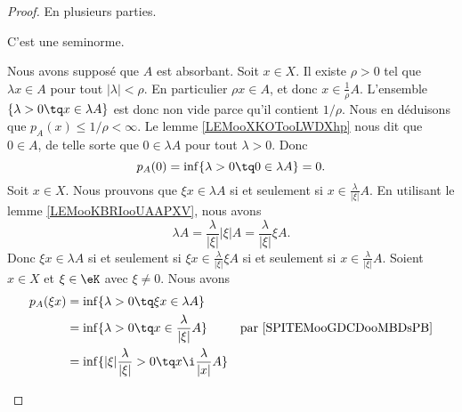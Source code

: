 \begin{proof}
	En plusieurs parties.
	\begin{proofpart}
		C'est une seminorme.
	\end{proofpart}
	\begin{subproof}
		Nous avons supposé que \( A\) est absorbant. Soit \( x\in X\). Il existe \( \rho>0\) tel que \( \lambda x\in A\) pour tout \( | \lambda |<\rho\). En particulier \( \rho x\in A\), et donc \( x\in \frac{1}{ \rho}A\). L'ensemble \( \{ \lambda >0\tq x\in \lambda A \}\) est donc non vide parce qu'il contient \( 1/\rho\). Nous en déduisons que \( p_A(x)\leq 1/\rho<\infty\).
		\spitem[\( p_A(0)=0\)]
		Le lemme \ref{LEMooXKOTooLWDXhp} nous dit que \( 0\in A\), de telle sorte que \( 0 \in \lambda A\) pour tout \( \lambda>0\). Donc
		\begin{equation}
			p_A(0)=\inf\{ \lambda >0\tq 0\in \lambda A \}=0.
		\end{equation}
				\label{SPITEMooGDCDooMBDsPB}
		Soit \( x\in X\). Nous prouvons que \( \xi x\in \lambda A\) si et seulement si \( x\in \frac{ \lambda }{ | \xi | }A\). En utilisant le lemme \ref{LEMooKBRIooUAAPXV}, nous avons
		\begin{equation}
			\lambda A=\frac{ \lambda }{ | \xi | }| \xi |A=\frac{ \lambda }{ | \xi | }\xi A.
		\end{equation}
		Donc \( \xi x\in \lambda A\) si et seulement si \( \xi x\in \frac{ \lambda }{ | \xi | }\xi A\) si et seulement si \( x\in \frac{ \lambda }{ | \xi | }A\).
		\spitem[\( p_A(\xi x)=| \xi |p_A(x)\)]
		Soient \( x\in X\) et \( \xi\in \eK\) avec \( \xi\neq 0\). Nous avons
		\begin{subequations}
			\begin{align}
				p_A(\xi x) & =\inf\{ \lambda>0\tq \xi x\in \lambda A \}                                                                                          \\
				           & =\inf\{ \lambda>0\tq x\in \frac{ \lambda }{ | \xi | }A \}                           & \text{par \ref{SPITEMooGDCDooMBDsPB}}         \\
				           & =\inf\{ | \xi |\frac{ \lambda }{ | \xi | }>0\tq x\i \frac{ \lambda }{ | x | }A \}                                                   \\

\end{align}
\end{subequations}
\end{subproof}
\end{proof}
